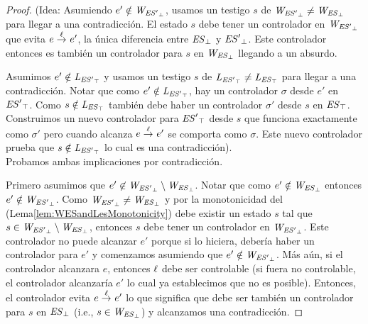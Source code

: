 \begin{proof}
	(Idea: Asumiendo $e' \notin \mathit{W_{\mathit{{\mathit{ES}'}_{\bot}}}}$, usamos un testigo $s$ de $\mathit{W_{\mathit{{\mathit{ES}'}_{\bot}}}} \neq 
	\mathit{W_{\mathit{{\mathit{ES}}_{\bot}}}}$ para llegar a una contradicción. El estado $s$ debe tener un controlador en 
	$\mathit{W_{\mathit{{\mathit{ES}'}_{\bot}}}}$ que evita $e \overset{\ell}{\rightarrow}_{} e'$, la única diferencia entre $\mathit{{\mathit{ES}}_{\bot}}$ y $\mathit{{\mathit{ES}'}_{\bot}}$. Este controlador entonces es también un controlador para $s$ en $\mathit{W_{\mathit{{\mathit{ES}}_{\bot}}}}$ llegando a un absurdo. 
	
	Asumimos $e' \notin \mathit{L_{\mathit{{\mathit{ES}'}_{\top}}}}$ y usamos un testigo $s$ de $\mathit{L_{\mathit{{\mathit{ES}'}_{\top}}}} \neq \mathit{L_{\mathit{{\mathit{ES}}_{\top}}}}$ para llegar a una contradicción. Notar que como $e' \notin \mathit{L_{\mathit{{\mathit{ES}'}_{\top}}}}$, hay un controlador $\sigma$ desde $e'$ en  
	$\mathit{{\mathit{ES}'}_{\top}}$. Como $s \notin \mathit{L_{\mathit{{\mathit{ES}}_{\top}}}}$ también debe haber un controlador $\sigma'$ desde $s$ en $\mathit{{\mathit{ES}}_{\top}}$. Construimos un nuevo controlador para $\mathit{{\mathit{ES}'}_{\top}}$ desde $s$ que funciona exactamente como $\sigma'$ pero cuando alcanza $e \overset{\ell}{\rightarrow}_{} e'$ se comporta como $\sigma$. Este nuevo controlador prueba que $s \notin \mathit{L_{\mathit{{\mathit{ES}'}_{\top}}}}$ lo cual es una contradicción).\\


Probamos ambas implicaciones por contradicción. 

Primero asumimos que $e' \not \in 
\mathit{W_{\mathit{{\mathit{ES}'}_{\bot}}}} \setminus \mathit{W_{\mathit{{\mathit{ES}}_{\bot}}}}$. Notar que como $e' \notin \mathit{W_{\mathit{{\mathit{ES}}_{\bot}}}}$ entonces $e' \notin \mathit{W_{\mathit{{\mathit{ES}'}_{\bot}}}}$. Como $\mathit{W_{\mathit{{\mathit{ES}'}_{\bot}}}} \neq \mathit{W_{\mathit{{\mathit{ES}}_{\bot}}}}$ y por la monotonicidad del (Lema\ref{lem:WESandLesMonotonicity}) debe existir un estado $s$ tal que $s \in \mathit{W_{\mathit{{\mathit{ES}'}_{\bot}}}} \setminus 
\mathit{W_{\mathit{{\mathit{ES}}_{\bot}}}}$, entonces $s$ debe tener un controlador en $\mathit{W_{\mathit{{\mathit{ES}'}_{\bot}}}} $. Este controlador no puede alcanzar $e'$ porque si lo hiciera, debería haber un controlador para $e'$ y comenzamos asumiendo que $e' 
\notin \mathit{W_{\mathit{{\mathit{ES}'}_{\bot}}}}$. Más aún, si el controlador alcanzara $e$, entonces $\ell$ debe ser controlable (si fuera no controlable, el controlador alcanzaría $e'$ lo cual ya establecimos que no es posible). Entonces, el controlador evita $e \overset{\ell}{\rightarrow}_{} e'$ lo que significa que debe ser también un controlador para $s$ en $\mathit{{\mathit{ES}}_{\bot}}$ (i.e.,  $s \in \mathit{W_{\mathit{{\mathit{ES}}_{\bot}}}}$) y alcanzamos una contradicción.


\end{proof}
